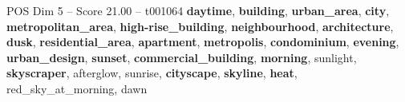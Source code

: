\begin{textsample}{POS Dim 5 – Score 21.00 – t001064}  \label{ex:f5_pos_010}
\textbf{daytime}, \textbf{building}, \textbf{urban\_area}, \textbf{city}, \textbf{metropolitan\_area}, \textbf{high-rise\_building}, \textbf{neighbourhood}, \textbf{architecture}, \textbf{dusk}, \textbf{residential\_area}, \textbf{apartment}, \textbf{metropolis}, \textbf{condominium}, \textbf{evening}, \textbf{urban\_design}, \textbf{sunset}, \textbf{commercial\_building}, \textbf{morning}, sunlight, \textbf{skyscraper}, afterglow, sunrise, \textbf{cityscape}, \textbf{skyline}, \textbf{heat}, red\_sky\_at\_morning, dawn

\end{textsample}
